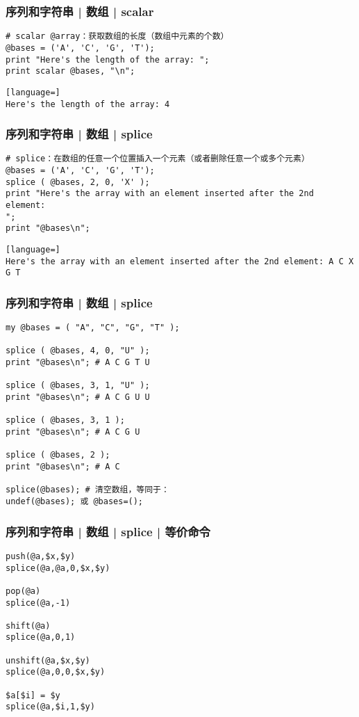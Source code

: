\begin{frame}[fragile]
  \frametitle{序列和字符串 | 数组 | \alert{scalar}}
\begin{lstlisting}
# scalar @array：获取数组的长度（数组中元素的个数）
@bases = ('A', 'C', 'G', 'T');
print "Here's the length of the array: ";
print scalar @bases, "\n";
\end{lstlisting}
\pause
\begin{lstlisting}[language=]
Here's the length of the array: 4
\end{lstlisting}
\end{frame}

\begin{frame}[fragile]
  \frametitle{序列和字符串 | 数组 | \alert{splice}}
\begin{lstlisting}
# splice：在数组的任意一个位置插入一个元素（或者删除任意一个或多个元素）
@bases = ('A', 'C', 'G', 'T');
splice ( @bases, 2, 0, 'X' );
print "Here's the array with an element inserted after the 2nd element:
";
print "@bases\n";
\end{lstlisting}
\pause
\begin{lstlisting}[language=]
Here's the array with an element inserted after the 2nd element: A C X G T
\end{lstlisting}
\end{frame}

\begin{frame}[fragile]
  \frametitle{序列和字符串 | 数组 | splice}
\begin{lstlisting}
my @bases = ( "A", "C", "G", "T" );

splice ( @bases, 4, 0, "U" );
print "@bases\n"; # A C G T U

splice ( @bases, 3, 1, "U" );
print "@bases\n"; # A C G U U

splice ( @bases, 3, 1 );
print "@bases\n"; # A C G U

splice ( @bases, 2 );
print "@bases\n"; # A C

splice(@bases); # 清空数组，等同于：
undef(@bases); 或 @bases=();
\end{lstlisting}
\end{frame}

\begin{frame}[fragile]
  \frametitle{序列和字符串 | 数组 | splice | 等价命令}
\begin{lstlisting}
push(@a,$x,$y)
splice(@a,@a,0,$x,$y)

pop(@a)
splice(@a,-1)

shift(@a)
splice(@a,0,1)

unshift(@a,$x,$y)
splice(@a,0,0,$x,$y)

$a[$i] = $y
splice(@a,$i,1,$y)
\end{lstlisting}
\end{frame}

